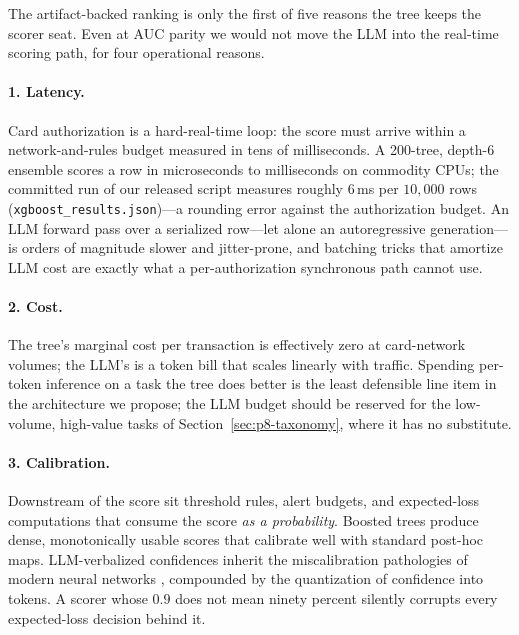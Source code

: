 \documentclass{article}
\providecommand{\secref}[1]{Section~\ref{#1}}
\begin{document}
The artifact-backed ranking is only the first of five reasons the tree keeps
the scorer seat. Even at AUC parity we would not move the LLM into the real-time scoring
path, for four operational reasons.

\paragraph{1. Latency.} Card authorization is a hard-real-time loop: the score
must arrive within a network-and-rules budget measured in tens of
milliseconds. A 200-tree, depth-6 ensemble scores a row in microseconds to
milliseconds on commodity CPUs; the committed run of our released script
measures roughly $6$\,ms per $10{,}000$ rows
(\texttt{xgboost\_results.json})---a rounding error against the authorization
budget. An LLM
forward pass over a serialized row---let alone an autoregressive
generation---is orders of magnitude slower and jitter-prone, and batching
tricks that amortize LLM cost are exactly what a per-authorization
synchronous path cannot use.

\paragraph{2. Cost.} The tree's marginal cost per transaction is effectively
zero at card-network volumes; the LLM's is a token bill that scales linearly
with traffic. Spending per-token inference on a task the tree does better is
the least defensible line item in the architecture we propose; the LLM budget
should be reserved for the low-volume, high-value tasks of
\secref{sec:p8-taxonomy}, where it has no substitute.

\paragraph{3. Calibration.} Downstream of the score sit threshold rules, alert
budgets, and expected-loss computations that consume the score \emph{as a
probability}. Boosted trees produce dense, monotonically usable scores that
calibrate well with standard post-hoc maps. LLM-verbalized confidences
inherit the miscalibration pathologies of modern neural networks
\citep{guo2017calibration}, compounded by the quantization of confidence into
tokens. A scorer whose $0.9$ does not mean ninety percent silently corrupts
every expected-loss decision behind it.
\end{document}
